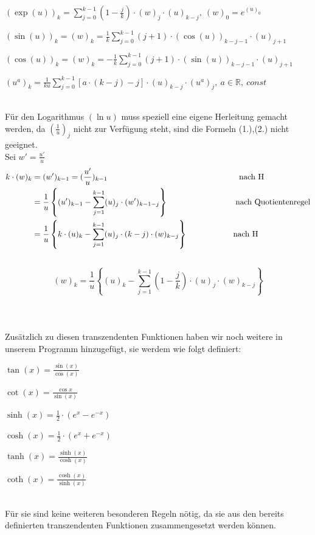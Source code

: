 \documentclass{scrartcl}
\begin{document}
\begin{flushleft}$(\exp(u))_k = \sum_{j=0}^{k-1}(1-\frac{j}{k})\cdot(w)_j \cdot(u)_{k-j}, \ (w)_0 = e^{(u)_0}$\end{flushleft}
\begin{flushleft}$(\sin(u))_k = (w)_k = \frac{1}{k}\sum_{j=0}^{k-1} (j+1)\cdot(\cos(u))_{k-j-1}\cdot (u)_{j+1}$\end{flushleft}
\begin{flushleft}$(\cos(u))_k = (w)_k = -\frac{1}{k}\sum_{j=0}^{k-1} (j+1)\cdot(\sin(u))_{k-j-1}\cdot (u)_{j+1}$\end{flushleft}
\begin{flushleft}$(u^a)_k = \frac{1}{ku} \sum_{j=0}^{k-1}[a\cdot(k-j)-j]\cdot (u)_{k-j} \cdot (u^a)_j, \ a \in \mathbb{R},\ const$\end{flushleft}
\\
\newpage
\noindent Für den Logarithmus $(\ln{u})$ muss speziell eine eigene Herleitung gemacht werden, da $(\frac{1}{u})_j$  nicht zur Verfügung steht, sind die Formeln (1.),(2.) nicht geeignet.\\
Sei $w'=\frac{u'}{u}$\\
\begin{align*}k\cdot(w)_k &= (w')_{k-1}=(\frac{u'}{u})_{k-1}\hspace*{5.75cm}\text{nach H}\\
&= \frac{1}{u}\left\{(u')_{k-1}-\sum_{j=1}^{k-1}(u)_j \cdot (w')_{k-1-j}\right\}\hspace*{2.95cm}\text{nach Quotientenregel}\\  
&= \frac{1}{u}\left\{k\cdot (u)_{k}-\sum_{j=1}^{k-1}(u)_j \cdot (k-j) \cdot (w)_{k-j}\right\}\hspace*{2cm}\text{nach H}\end{align*}\\ 
$$(w)_k=\frac{1}{u}\left\{(u)_{k}-\sum_{j=1}^{k-1} (1-\frac{j}{k})\cdot  (u)_j \cdot (w)_{k-j}\right\}$$\\
\\
\\
Zusätzlich zu diesen transzendenten Funktionen haben wir noch weitere in unserem Programm hinzugefügt, sie werdem wie folgt definiert:
\begin{flushleft}$\tan(x)=\frac{\sin(x)}{\cos(x)}$\end{flushleft}
\begin{flushleft}$\cot(x)=\frac{\cos{x}}{\sin(x)}$\end{flushleft}
\begin{flushleft}$\sinh(x)=\frac{1}{2}\cdot (e^x-e^{-x})$\end{flushleft}
\begin{flushleft}$\cosh(x)=\frac{1}{2}\cdot (e^x+e^{-x})$\end{flushleft}
\begin{flushleft}$\tanh(x)=\frac{\sinh(x)}{\cosh(x)}$\end{flushleft}
\begin{flushleft}$\coth(x)=\frac{\cosh(x)}{\sinh(x)}$\end{flushleft}\\
Für sie sind keine weiteren besonderen Regeln nötig, da sie aus den bereits definierten transzendenten Funktionen zusammengesetzt werden können. 
\end{document}
